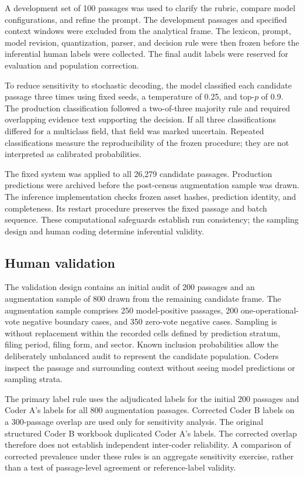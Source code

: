 \documentclass[12pt]{article}
\begin{document}
A development set of 100 passages was used to clarify the rubric, compare
model configurations, and refine the prompt. The development passages and
specified context windows were excluded from the analytical frame. The
lexicon, prompt, model revision, quantization, parser, and decision rule were
then frozen before the inferential human labels were collected. The final
audit labels were reserved for evaluation and population correction.

To reduce sensitivity to stochastic decoding, the model classified each
candidate passage three times using fixed seeds, a temperature of 0.25, and
top-\(p\) of 0.9. The production classification followed a two-of-three
majority rule and required overlapping evidence text supporting the decision.
If all three classifications differed for a multiclass field, that field was
marked uncertain. Repeated classifications measure the reproducibility of the
frozen procedure; they are not interpreted as calibrated probabilities.

The fixed system was applied to all 26,279 candidate passages. Production
predictions were archived before the post-census augmentation sample was drawn.
The inference implementation checks frozen asset hashes, prediction identity,
and completeness. Its restart procedure preserves the fixed passage and batch
sequence. These computational safeguards establish run consistency; the
sampling design and human coding determine inferential validity.

\subsection{Human validation}
\label{sec:validation}

The validation design contains an initial audit of 200 passages and
an augmentation sample of 800 drawn from the remaining candidate frame.
The augmentation sample comprises 250 model-positive passages, 200
one-operational-vote negative boundary cases, and 350 zero-vote negative
cases. Sampling is without replacement within the recorded cells defined by
prediction stratum, filing period, filing form, and sector. Known inclusion
probabilities allow the deliberately unbalanced audit to represent the
candidate population. Coders inspect the passage and surrounding context
without seeing model predictions or sampling strata.

The primary label rule uses the adjudicated labels for the initial 200
passages and Coder A's labels for all 800 augmentation passages. Corrected
Coder B labels on a 300-passage overlap are used only for sensitivity analysis.
The original structured Coder B workbook duplicated Coder A's labels. The corrected overlap therefore does not
establish independent inter-coder reliability. A comparison of corrected prevalence under these rules is an aggregate
sensitivity exercise, rather than a test of passage-level agreement or
reference-label validity.
\end{document}
